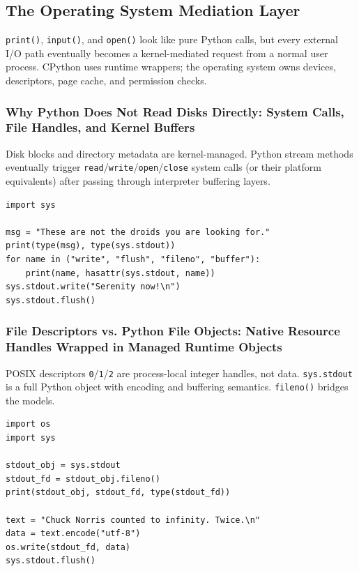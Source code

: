 \subsection{The Operating System Mediation Layer}

\texttt{print()}, \texttt{input()}, and \texttt{open()} look like pure Python calls, but every external I/O path eventually becomes a kernel-mediated request from a normal user process. CPython uses runtime wrappers; the operating system owns devices, descriptors, page cache, and permission checks.

\subsubsection{Why Python Does Not Read Disks Directly: System Calls, File Handles, and Kernel Buffers}

Disk blocks and directory metadata are kernel-managed. Python stream methods eventually trigger \texttt{read}/\texttt{write}/\texttt{open}/\texttt{close} system calls (or their platform equivalents) after passing through interpreter buffering layers.

\begin{verbatim}
import sys

msg = "These are not the droids you are looking for."
print(type(msg), type(sys.stdout))
for name in ("write", "flush", "fileno", "buffer"):
    print(name, hasattr(sys.stdout, name))
sys.stdout.write("Serenity now!\n")
sys.stdout.flush()
\end{verbatim}

\subsubsection{File Descriptors vs. Python File Objects: Native Resource Handles Wrapped in Managed Runtime Objects}

POSIX descriptors \texttt{0}/\texttt{1}/\texttt{2} are process-local integer handles, not data. \texttt{sys.stdout} is a full Python object with encoding and buffering semantics. \texttt{fileno()} bridges the models.

\begin{verbatim}
import os
import sys

stdout_obj = sys.stdout
stdout_fd = stdout_obj.fileno()
print(stdout_obj, stdout_fd, type(stdout_fd))

text = "Chuck Norris counted to infinity. Twice.\n"
data = text.encode("utf-8")
os.write(stdout_fd, data)
sys.stdout.flush()
\end{verbatim}

